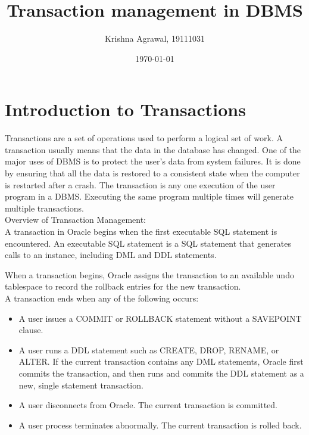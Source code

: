 \documentclass{article}
\title{Transaction management in DBMS}
\author{Krishna Agrawal, 19111031}
\date{\today}
\begin{document}
\maketitle


\section{Introduction to Transactions}

Transactions are a set of operations used to perform a logical set of work. A transaction usually means that the data in the database has changed. One of the major uses of DBMS is to protect the user’s data from system failures. It is done by ensuring that all the data is restored to a consistent state when the computer is restarted after a crash. The transaction is any one execution of the user program in a DBMS. Executing the same program multiple times will generate multiple transactions.\\

Overview of Transaction Management:\\


A transaction in Oracle begins when the first executable SQL statement is encountered. An executable SQL statement is a SQL statement that generates calls to an instance, including DML and DDL statements.

When a transaction begins, Oracle assigns the transaction to an available undo tablespace to record the rollback entries for the new transaction.\\

A transaction ends when any of the following occurs:

\begin{itemize}

\item A user issues a COMMIT or ROLLBACK statement without a SAVEPOINT clause.

\item A user runs a DDL statement such as CREATE, DROP, RENAME, or ALTER. If the current transaction contains any DML statements, Oracle first commits the transaction, and then runs and commits the DDL statement as a new, single statement transaction.

\item A user disconnects from Oracle. The current transaction is committed.

\item A user process terminates abnormally. The current transaction is rolled back.

\end{itemize}
\end{document}
